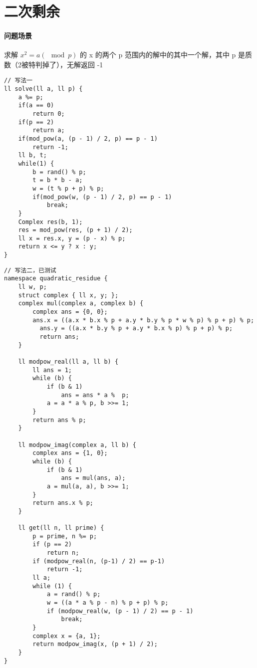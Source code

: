 \section{二次剩余}

\paragraph{问题场景} 求解 $x^2 = a (\mod p)$ 的 x 的两个 p 范围内的解中的其中一个解，其中 p 是质数（2被特判掉了），无解返回 -1

\begin{verbatim}
// 写法一
ll solve(ll a, ll p) {
    a %= p;
    if(a == 0)
        return 0;
    if(p == 2)
        return a;
    if(mod_pow(a, (p - 1) / 2, p) == p - 1)
        return -1;
    ll b, t;
    while(1) {
        b = rand() % p;
        t = b * b - a;
        w = (t % p + p) % p;
        if(mod_pow(w, (p - 1) / 2, p) == p - 1)
            break;
    }
    Complex res(b, 1);
    res = mod_pow(res, (p + 1) / 2);
    ll x = res.x, y = (p - x) % p;
    return x <= y ? x : y;
}
\end{verbatim}

\begin{verbatim}
// 写法二，已测试
namespace quadratic_residue {
    ll w, p;
    struct complex { ll x, y; };    
    complex mul(complex a, complex b) {
        complex ans = {0, 0};
        ans.x = ((a.x * b.x % p + a.y * b.y % p * w % p) % p + p) % p;
          ans.y = ((a.x * b.y % p + a.y * b.x % p) % p + p) % p;
          return ans;
    }
    
    ll modpow_real(ll a, ll b) {
        ll ans = 1;
        while (b) {
            if (b & 1)
                ans = ans * a %  p;
            a = a * a % p, b >>= 1;
        }
        return ans % p;
    }
    
    ll modpow_imag(complex a, ll b) {
        complex ans = {1, 0};
        while (b) {
            if (b & 1)
                ans = mul(ans, a);
            a = mul(a, a), b >>= 1;
        }
        return ans.x % p;
    }
    
    ll get(ll n, ll prime) {
        p = prime, n %= p;
        if (p == 2)
            return n;
        if (modpow_real(n, (p-1) / 2) == p-1)
            return -1;
        ll a;
        while (1) {
            a = rand() % p;
            w = ((a * a % p - n) % p + p) % p;
            if (modpow_real(w, (p - 1) / 2) == p - 1)
                break;
        }
        complex x = {a, 1};
        return modpow_imag(x, (p + 1) / 2);
    }
}
\end{verbatim}